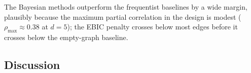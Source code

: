 The Bayesian methods outperform the frequentist baselines by a wide margin, plausibly because the maximum partial correlation in the design is modest ($\rho_{\max} \approx 0.38$ at $d = 5$); the EBIC penalty crosses below most edges before it crosses below the empty-graph baseline.
\subsection{Discussion}



